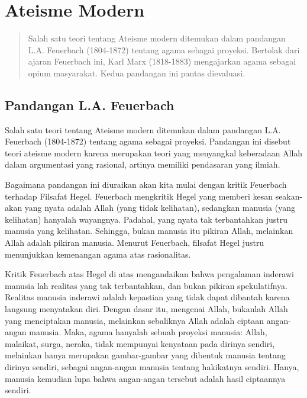 \documentclass[11pt,twoside,a5paper,openany]{memoir}
\begin{document}
\hypertarget{ateisme-modern}{%
\section{Ateisme Modern}\label{ateisme-modern}}

\begin{quote}
Salah satu teori tentang Ateisme modern ditemukan dalam pandangan L.A.
Feuerbach (1804-1872) tentang agama sebagai proyeksi. Bertolak dari
ajaran Feuerbach ini, Karl Marx (1818-1883) mengajarkan agama sebagai
opium masyarakat. Kedua pandangan ini pantas dievaluasi.
\end{quote}

\hypertarget{pandangan-l.a.-feuerbach}{%
\subsection{Pandangan L.A. Feuerbach}\label{pandangan-l.a.-feuerbach}}

Salah satu teori tentang Ateisme modern ditemukan dalam pandangan L.A.
Feuerbach (1804-1872) tentang agama sebagai proyeksi. Pandangan ini
disebut teori ateisme modern karena merupakan teori yang menyangkal
keberadaan Allah dalam argumentasi yang rasional, artinya memiliki
pendasaran yang ilmiah.

Bagaimana pandangan ini diuraikan akan kita mulai dengan kritik
Feuerbach terhadap Filsafat Hegel. Feuerbach mengkritik Hegel yang
memberi kesan seakan-akan yang nyata adalah Allah (yang tidak
kelihatan), sedangkan manusia (yang kelihatan) hanyalah wayangnya.
Padahal, yang nyata tak terbantahkan justru manusia yang kelihatan.
Sehingga, bukan manusia itu pikiran Allah, melainkan Allah adalah
pikiran manusia. Menurut Feuerbach, filsafat Hegel justru menunjukkan
kemenangan agama atas rasionalitas.

Kritik Feuerbach atas Hegel di atas mengandaikan bahwa pengalaman
inderawi manusia lah realitas yang tak terbantahkan, dan bukan pikiran
spekulatifnya. Realitas manusia inderawi adalah kepastian yang tidak
dapat dibantah karena langsung menyatakan diri. Dengan dasar itu,
mengenai Allah, bukanlah Allah yang menciptakan manusia, melainkan
sebaliknya Allah adalah ciptaan angan-angan manusia. Maka, agama
hanyalah sebuah proyeksi manusia: Allah, malaikat, surga, neraka, tidak
mempunyai kenyataan pada dirinya sendiri, melainkan hanya merupakan
gambar-gambar yang dibentuk manusia tentang dirinya sendiri, sebagai
angan-angan manusia tentang hakikatnya sendiri. Hanya, manusia kemudian
lupa bahwa angan-angan tersebut adalah hasil ciptaannya sendiri.
\end{document}
